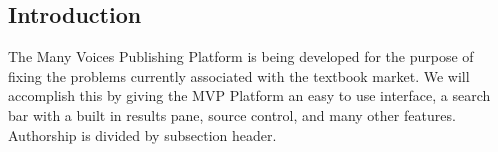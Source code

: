 \documentclass[letterpaper, 10pt, draftclsnofoot, compsoc, onecolumn]{IEEEtran}
\begin{document}
\begin{comment}


I. Introduction to entire tech review, including authorship of each section

II.  Technologies 1-9 (each person responsible for 3)

(1)     Technology 1

a.       Options 1, 2, and 3

b.       Goals for use in design

c.       Criteria being evaluated (e.g., cost, availability, speed, security, etc)

d.       Table comparing option 1, option 2, option 3 based on criteria

e.       Discussion

f.        Selection of best option based on criteria

(2)     Technology 2

a.       Options 1, 2, and 3

b.       Goals for use in design

c.       Criteria being evaluated (e.g., cost, availability, speed, security, etc)

d.       Table comparing option 1, option 2, option 3 based on criteria

e.       Discussion

f.        Selection of best option based on criteria

(3)     Technology 3

a.       Options 1, 2, and 3

b.       Goals

c.       Criteria

d.       Table

e.       Discussion

f.        Selection of best option based on criteria

(4)     ….etc….

III.                Conclusion

IV.                Bibliography

\end{comment}
\vspace{1pc}
\subsection{Introduction}
\vspace{1pc}

{\noindent The Many Voices Publishing Platform is being developed for the purpose of fixing the problems currently associated with the textbook market. We will accomplish this by giving the MVP Platform an easy to use interface, a search bar with a built in results pane, source control, and many other features. Authorship is divided by subsection header.\par}
\end{document}
